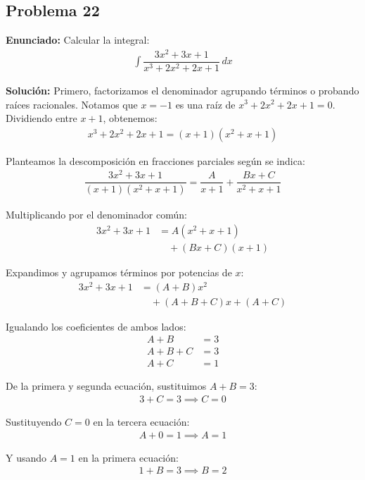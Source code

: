 \subsection*{Problema 22}
\textbf{Enunciado:} Calcular la integral:
\begin{align*}
\int \dfrac{3x^2 + 3x + 1}{x^3 + 2x^2 + 2x + 1} \, dx
\end{align*}

\textbf{Solución:} 
Primero, factorizamos el denominador agrupando
términos o probando raíces racionales. 
Notamos que $x = -1$ es una raíz de 
$x^3 + 2x^2 + 2x + 1 = 0$. 
Dividiendo entre $x + 1$, obtenemos:
\begin{align*}
x^3 + 2x^2 + 2x + 1 = (x + 1)(x^2 + x + 1)
\end{align*}

Planteamos la descomposición en 
fracciones parciales según se indica:
\begin{align*}
\dfrac{3x^2 + 3x + 1}{(x + 1)(x^2 + x + 1)} = 
\dfrac{A}{x + 1} + \dfrac{Bx + C}{x^2 + x + 1}
\end{align*}

Multiplicando por el denominador común:
\begin{align*}
3x^2 + 3x + 1 &= A(x^2 + x + 1) \\
&\quad + (Bx + C)(x + 1)
\end{align*}

Expandimos y agrupamos términos por potencias de $x$:
\begin{align*}
3x^2 + 3x + 1 &= (A + B)x^2 \\
&\quad + (A + B + C)x + (A + C)
\end{align*}

Igualando los coeficientes de ambos lados:
\begin{align*}
A + B &= 3 \\
A + B + C &= 3 \\
A + C &= 1
\end{align*}

De la primera y segunda ecuación, 
sustituimos $A + B = 3$:
\begin{align*}
3 + C = 3 \implies C = 0
\end{align*}

Sustituyendo $C = 0$ en la tercera ecuación:
\begin{align*}
A + 0 = 1 \implies A = 1
\end{align*}

Y usando $A = 1$ en la primera ecuación:
\begin{align*}
1 + B = 3 \implies B = 2
\end{align*}

